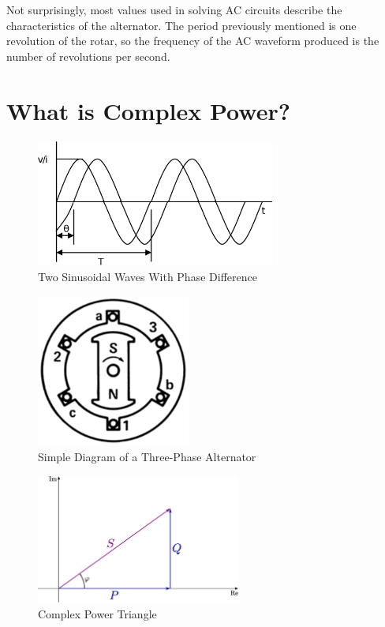 \documentclass[11pt]{article}
\begin{document}
  Not surprisingly, most values used in solving \ac{AC} circuits describe the
  characteristics of the alternator.  The period previously mentioned is one
  revolution of the rotar, so the frequency of the \ac{AC} waveform produced is
  the number of revolutions per second.

  \section*{What is Complex Power?}

  \begin{figure}[p]
    \centering
    \includegraphics[width=0.7\textwidth]{acwave}
    \caption{Two Sinusoidal Waves With Phase Difference}
    \label{acwave}
  \end{figure}

  \begin{figure}[p]
    \centering
    \includegraphics[width=0.45\textwidth]{threephasemotor}
    \caption{Simple Diagram of a Three-Phase Alternator}
    \label{alternator}
  \end{figure}

  \begin{figure}[p]
    \centering
    \includegraphics[width=0.6\textwidth]{complexpwr}
    \caption{Complex Power Triangle}
    \label{complexpwr}
  \end{figure}
\end{document}
